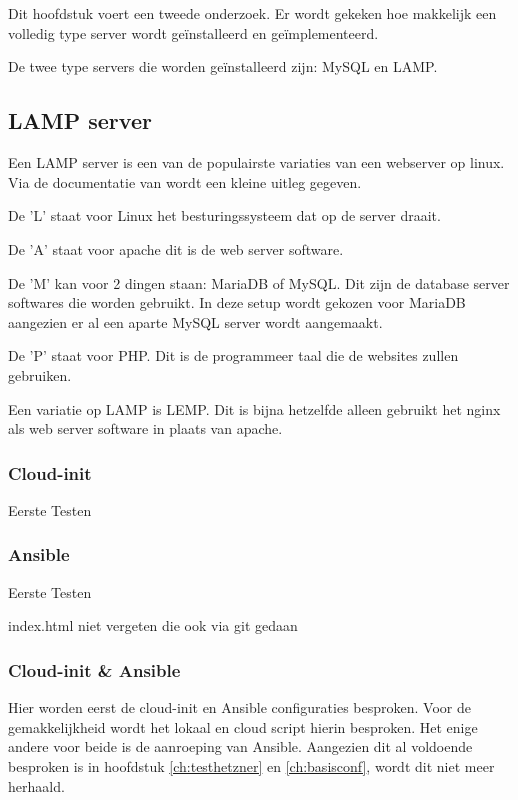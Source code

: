 \chapter{}
\label{ch:serverconf}
Dit hoofdstuk voert een tweede onderzoek. Er wordt gekeken hoe makkelijk een volledig type server wordt geïnstalleerd en geïmplementeerd. 

De twee type servers die worden geïnstalleerd zijn: MySQL en LAMP.

\section{LAMP server}
Een LAMP server is een van de populairste variaties van een webserver op linux. Via de documentatie van \autocite{lamp} wordt een kleine uitleg gegeven.
 
De 'L' staat voor Linux het besturingssysteem dat op de server draait. 

De 'A' staat voor apache dit is de web server software. 

De 'M' kan voor 2 dingen staan: MariaDB of MySQL. Dit zijn de database server softwares die worden gebruikt. In deze setup wordt gekozen voor MariaDB aangezien er al een aparte MySQL server wordt aangemaakt.

De 'P' staat voor PHP. Dit is de programmeer taal die de websites zullen gebruiken.

Een variatie op LAMP is LEMP. Dit is bijna hetzelfde alleen gebruikt het nginx als web server software in plaats van apache.


\subsection{Cloud-init}
Eerste Testen

\subsection{Ansible}
Eerste Testen

index.html niet vergeten die ook via git gedaan 

\subsection{Cloud-init \& Ansible}
\label{ch:cloudansiserverconf}
Hier worden eerst de cloud-init en Ansible configuraties besproken. Voor de gemakkelijkheid wordt het lokaal en cloud script hierin besproken. Het enige andere voor beide is de aanroeping van Ansible. Aangezien dit al voldoende besproken is in hoofdstuk \ref*{ch:testhetzner} en \ref*{ch:basisconf}, wordt dit niet meer herhaald. 

